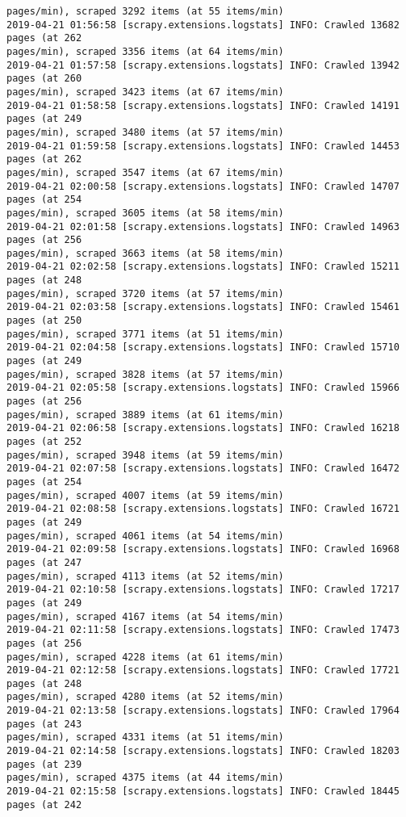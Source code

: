 \documentclass[11pt]{article}
\begin{document}
\begin{Verbatim}[commandchars=\\\{\},fontsize=\footnotesize]
pages/min), scraped 3292 items (at 55 items/min)
2019-04-21 01:56:58 [scrapy.extensions.logstats] INFO: Crawled 13682 pages (at 262
pages/min), scraped 3356 items (at 64 items/min)
2019-04-21 01:57:58 [scrapy.extensions.logstats] INFO: Crawled 13942 pages (at 260
pages/min), scraped 3423 items (at 67 items/min)
2019-04-21 01:58:58 [scrapy.extensions.logstats] INFO: Crawled 14191 pages (at 249
pages/min), scraped 3480 items (at 57 items/min)
2019-04-21 01:59:58 [scrapy.extensions.logstats] INFO: Crawled 14453 pages (at 262
pages/min), scraped 3547 items (at 67 items/min)
2019-04-21 02:00:58 [scrapy.extensions.logstats] INFO: Crawled 14707 pages (at 254
pages/min), scraped 3605 items (at 58 items/min)
2019-04-21 02:01:58 [scrapy.extensions.logstats] INFO: Crawled 14963 pages (at 256
pages/min), scraped 3663 items (at 58 items/min)
2019-04-21 02:02:58 [scrapy.extensions.logstats] INFO: Crawled 15211 pages (at 248
pages/min), scraped 3720 items (at 57 items/min)
2019-04-21 02:03:58 [scrapy.extensions.logstats] INFO: Crawled 15461 pages (at 250
pages/min), scraped 3771 items (at 51 items/min)
2019-04-21 02:04:58 [scrapy.extensions.logstats] INFO: Crawled 15710 pages (at 249
pages/min), scraped 3828 items (at 57 items/min)
2019-04-21 02:05:58 [scrapy.extensions.logstats] INFO: Crawled 15966 pages (at 256
pages/min), scraped 3889 items (at 61 items/min)
2019-04-21 02:06:58 [scrapy.extensions.logstats] INFO: Crawled 16218 pages (at 252
pages/min), scraped 3948 items (at 59 items/min)
2019-04-21 02:07:58 [scrapy.extensions.logstats] INFO: Crawled 16472 pages (at 254
pages/min), scraped 4007 items (at 59 items/min)
2019-04-21 02:08:58 [scrapy.extensions.logstats] INFO: Crawled 16721 pages (at 249
pages/min), scraped 4061 items (at 54 items/min)
2019-04-21 02:09:58 [scrapy.extensions.logstats] INFO: Crawled 16968 pages (at 247
pages/min), scraped 4113 items (at 52 items/min)
2019-04-21 02:10:58 [scrapy.extensions.logstats] INFO: Crawled 17217 pages (at 249
pages/min), scraped 4167 items (at 54 items/min)
2019-04-21 02:11:58 [scrapy.extensions.logstats] INFO: Crawled 17473 pages (at 256
pages/min), scraped 4228 items (at 61 items/min)
2019-04-21 02:12:58 [scrapy.extensions.logstats] INFO: Crawled 17721 pages (at 248
pages/min), scraped 4280 items (at 52 items/min)
2019-04-21 02:13:58 [scrapy.extensions.logstats] INFO: Crawled 17964 pages (at 243
pages/min), scraped 4331 items (at 51 items/min)
2019-04-21 02:14:58 [scrapy.extensions.logstats] INFO: Crawled 18203 pages (at 239
pages/min), scraped 4375 items (at 44 items/min)
2019-04-21 02:15:58 [scrapy.extensions.logstats] INFO: Crawled 18445 pages (at 242

\end{Verbatim}
\end{document}
